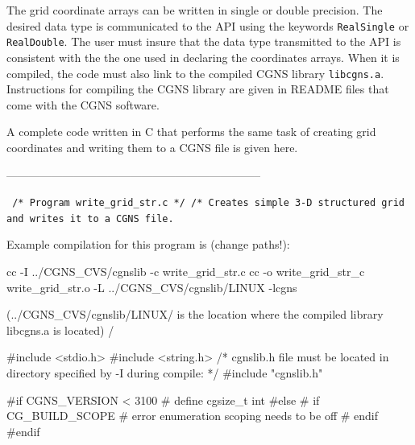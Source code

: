 \documentclass[12pt]{article}
\begin{document}
The grid coordinate arrays can be written in single or double
precision.  The desired data type is communicated to the API using the
keywords {\tt RealSingle} or {\tt RealDouble}.  The user must
insure that the data type transmitted to the API is consistent with
the the one used in declaring the coordinates arrays.
When it is compiled, the code must also link to the 
compiled CGNS library {\tt libcgns.a}.
Instructions for compiling the CGNS library
are given in README files that come with the CGNS software.

A complete code written in C that performs the same task of
creating grid coordinates and writing them to a CGNS file is given here.

--------------------------------------------------------------------

{\tt
\noindent /*   Program write\_grid\_str.c    */
\newline /*
\newline Creates simple 3-D structured grid and writes it to a
\newline CGNS file.

\noindent Example compilation for this program is (change paths!):

\noindent cc -I ../CGNS\_CVS/cgnslib -c write\_grid\_str.c
\newline cc -o write\_grid\_str\_c write\_grid\_str.o -L ../CGNS\_CVS/cgnslib/LINUX -lcgns

\noindent (../CGNS\_CVS/cgnslib/LINUX/ is the location where the compiled
\noindent library libcgns.a is located)
\newline */

\noindent \#include <stdio.h>
\newline \#include <string.h>
\newline /* cgnslib.h file must be located in directory specified by -I during compile: */
\newline \#include "cgnslib.h"

\noindent \#if CGNS\_VERSION < 3100
\newline \# define cgsize\_t int
\newline \#else
\newline \# if CG\_BUILD\_SCOPE
\newline \#  error enumeration scoping needs to be off
\newline \# endif
\newline \#endif

}
\end{document}
